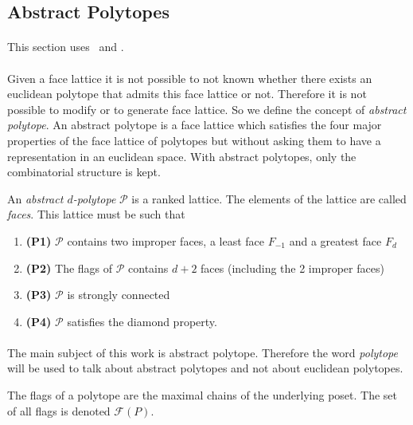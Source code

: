 \subsection{Abstract Polytopes}

\paragraph{}
This section uses~\cite{incidenceGeometry} and \cite{abstractRegularPolytopes}.

\paragraph{}
Given a face lattice it is not possible to not known whether there exists an euclidean polytope that admits this face lattice or not. Therefore it is not possible to modify or to generate face lattice. So we define the concept of \textit{abstract polytope}. An abstract polytope is a face lattice which satisfies the four major properties of the face lattice of polytopes but without asking them to have a representation in an euclidean space. With abstract polytopes, only the combinatorial structure is kept.

\begin{definition}
  An \textit{abstract $d$-polytope} $\mathcal P$ is a ranked lattice. The elements of the lattice are called \textit{faces}. This lattice must be such that
  \begin{enumerate}
    \item \textbf{(P1)} $\mathcal P$ contains two improper faces, a least face $F_{-1}$ and a greatest face $F_d$
    \item \textbf{(P2)} The flags of $\mathcal P$ contains $d + 2$ faces (including the 2 improper faces)
    \item \textbf{(P3)} $\mathcal P$ is strongly connected
    \item \textbf{(P4)} $\mathcal P$ satisfies the diamond property.
  \end{enumerate}
\end{definition}

\paragraph{}
The main subject of this work is abstract polytope. Therefore the word \textit{polytope} will be used to talk about abstract polytopes and not about euclidean polytopes.

\begin{definition}
  The flags of a polytope are the maximal chains of the underlying poset. The set of all flags is denoted $\mathcal F(P)$.
\end{definition}

